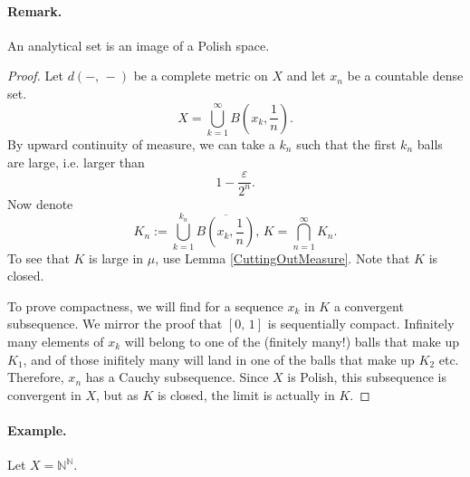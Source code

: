 \paragraph{Remark.} An analytical set is an image of a Polish space.


\begin{proof}
Let \( d(-,\, -) \) be a complete metric on \( X \) and let \( x_n \) be a countable dense set. 
\[ 
    X = \bigcup_{k = 1}^\infty B \left( x_k, \frac{1}{n} \right). 
\]
By upward continuity of measure, we can take a \( k_n \) such that the first \( k_n \) balls are large, i.e. larger than
\[ 
1 - \frac{\varepsilon}{2^n}. 
\]
Now denote
\[ 
    K_n := \bigcup_{k = 1}^{k_n} \overline{B \left( x_k, \frac{1}{n} \right)},\, K = \bigcap_{n = 1}^\infty K_n.
\]
To see that \( K \) is large in \( \mu \), use Lemma \ref{CuttingOutMeasure}. Note that \( K \) is closed.

To prove compactness, we will find for a sequence \( x_k \) in \( K \) a convergent subsequence. We mirror the proof that \( [0,\,1] \) is sequentially compact. Infinitely many elements of \( x_k \) will belong to one of the (finitely many!) balls that make up \( K_1 \), and of those inifitely many will land in one of the balls that make up \( K_2 \) etc. Therefore, \( x_n \) has a Cauchy subsequence. Since \( X \) is Polish, this subsequence is convergent in \( X \), but as \( K \) is closed, the limit is actually in \( K \).
\end{proof}

\paragraph{Example.} Let \( X = \mathbb{N}^{ \mathbb{N} } \).

